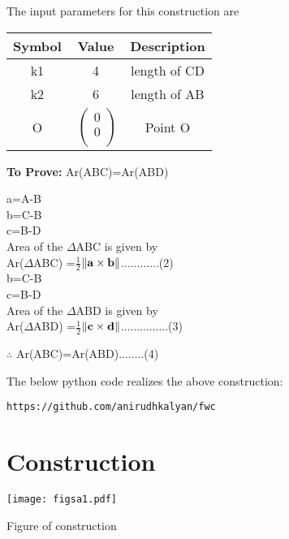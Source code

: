 \documentclass[10pt, a4paper]{article}
\newcommand{\myvec}[1]{\ensuremath{\begin{pmatrix}#1\end{pmatrix}}}
\let\vec\mathbf
\begin{document}
The input parameters for this construction are 
\begin{center}
\begin{tabular}{|c|c|c|}
	\hline
	\textbf{Symbol}&\textbf{Value}&\textbf{Description}\\
	\hline
	k1&4&length of CD\\
	\hline
	k2&6&length of AB\\
	\hline
 
	\hline
	O&$\
	\begin{pmatrix}
		0 \\
		0 \\
	\end{pmatrix}$%
	&Point O\\
	
	\hline
\end{tabular}
\end{center}
\textbf{To Prove:} Ar(ABC)=Ar(ABD)
		\begin{center}
	a=A-B\\
	b=C-B\\
	c=B-D\\
	Area of the $\Delta$ABC is given by \\
Ar($\Delta$ABC) =$\frac{1}{2}$$\norm{\vec{a}\times\vec{b}}$............(2)\\
    b=C-B\\
	c=B-D\\
		Area of the $\Delta$ABD is given by \\
 Ar($\Delta$ABD) =$\frac{1}{2}$$\norm{\vec{c}\times\vec{d}}$...............(3)
	\end{center}
	
	\begin{center}
$\therefore$ Ar(ABC)=Ar(ABD)........(4)\\
	\end{center}
The below python code realizes the above construction:	
\begin{lstlisting}
https://github.com/anirudhkalyan/fwc
\end{lstlisting}
 \section{Construction}
 	\begin{center}
  \texttt{[image: figsa1.pdf]}
  
  Figure of construction
  	\end{center}
  	  

\end{document}
